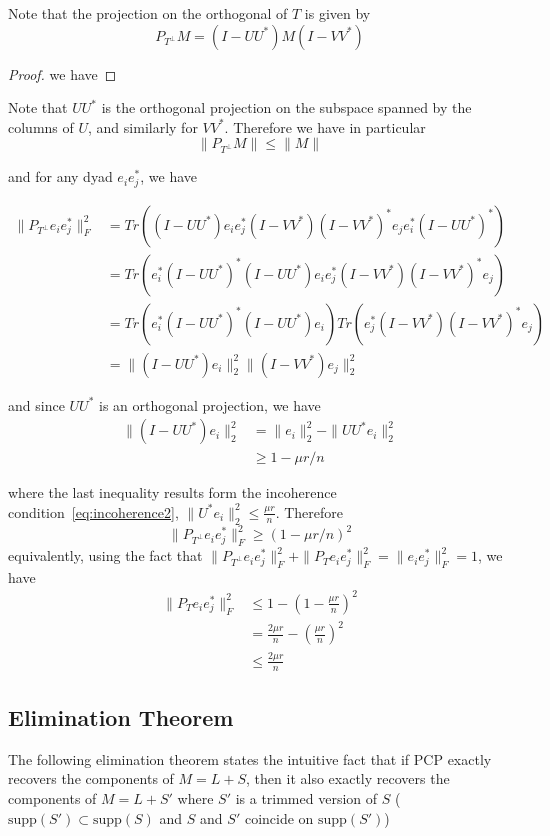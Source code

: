 \documentclass{../common/projectreport}
\begin{document}
Note that the projection on the orthogonal of $T$ is given by
\[
P_{T^\perp} M = (I - UU^*)M(I - VV^*)
\]
\begin{proof}
we have 
\end{proof}

Note that $UU^*$ is the orthogonal projection on the subspace spanned by the columns of $U$, and similarly for $VV^*$. Therefore we have in particular
\[
\|P_{T^\perp} M \| \leq \|M\|
\]

and for any dyad $e_i e_j^*$, we have

\begin{align*}
\|P_{T^\perp} e_ie_j^*\|_F^2
&= Tr\left( (I-UU^*)e_ie_j^*(I-VV^*)(I-VV^*)^*e_je_i^*(I-UU^*)^* \right) \\
&= Tr\left( e_i^*(I-UU^*)^*(I-UU^*)e_ie_j^*(I-VV^*)(I-VV^*)^*e_j \right) \\
&= Tr\left( e_i^*(I-UU^*)^*(I-UU^*)e_i\right) Tr \left(e_j^*(I-VV^*)(I-VV^*)^*e_j \right) \\
&= \|(I - UU^*)e_i\|_2^2 \|(I - VV^*)e_j\|_2^2
\end{align*}

and since $UU^*$ is an orthogonal projection, we have
\begin{align*}
\|(I - UU^*)e_i\|_2^2 
&= \|e_i\|_2^2 - \|UU^*e_i\|_2^2 \\
&\geq 1 - \mu r / n
\end{align*}

where the last inequality results form the incoherence condition~\ref{eq:incoherence2}, $\|U^*e_i\|_2^2 \leq \frac{\mu r}{n}$. Therefore 
\[
\|P_{T^\perp} e_ie_j^*\|_F^2 \geq (1 - \mu r / n)^2
\]
equivalently, using the fact that $\|P_{T^\perp} e_ie_j^*\|_F^2 + \|P_{T} e_ie_j^*\|_F^2 = \|e_ie_j^*\|_F^2 = 1$, we have
\begin{align*}
\|P_{T} e_ie_j^*\|_F^2 
&\leq 1 - (1 - \frac{\mu r}{n})^2 \\
&= \frac{2\mu r}{n} - \left( \frac{\mu r}{n} \right)^2 \\
&\leq \frac{2\mu r}{n}
\end{align*}


\subsection{Elimination Theorem}
The following elimination theorem states the intuitive fact that if PCP exactly recovers the components of $M = L+S$, then it also exactly recovers the components of $M = L+S'$ where $S'$ is a trimmed version of $S$ ($\text{supp}(S')\subset \text{supp}(S)$ and $S$ and $S'$ coincide on $\text{supp}(S')$)
\end{document}
